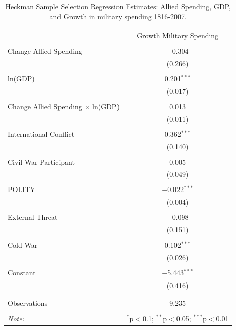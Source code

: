 \documentclass[12pt]{article}
\begin{document}
\begin{table}[!htbp] \centering 
\begin{tabular}{@{\extracolsep{5pt}}lc} 
\\[-1.8ex]\hline 
\hline \\[-1.8ex] 
 & Growth Military Spending \\ 
\hline \\[-1.8ex] 
 Change Allied Spending & $-$0.304 \\ 
  & (0.266) \\ 
  & \\ 
 ln(GDP) & 0.201$^{***}$ \\ 
  & (0.017) \\ 
  & \\ 
 Change Allied Spending $\times$ ln(GDP) & 0.013 \\ 
  & (0.011) \\ 
  & \\ 
 International Conflict & 0.362$^{***}$ \\ 
  & (0.140) \\ 
  & \\ 
 Civil War Participant & 0.005 \\ 
  & (0.049) \\ 
  & \\ 
 POLITY & $-$0.022$^{***}$ \\ 
  & (0.004) \\ 
  & \\ 
 External Threat & $-$0.098 \\ 
  & (0.151) \\ 
  & \\ 
 Cold War & 0.102$^{***}$ \\ 
  & (0.026) \\ 
  & \\ 
 Constant & $-$5.443$^{***}$ \\ 
  & (0.416) \\ 
  & \\ 
\hline \\[-1.8ex] 
Observations & 9,235 \\ 
\hline 
\hline \\[-1.8ex] 
\textit{Note:}  & \multicolumn{1}{r}{$^{*}$p$<$0.1; $^{**}$p$<$0.05; $^{***}$p$<$0.01} \\ 
\end{tabular} 
\caption{Heckman Sample Selection Regression Estimates: Allied Spending, GDP, and Growth in military spending 1816-2007.}
\label{tab:heckit-res}
\end{table} 
\end{document}
